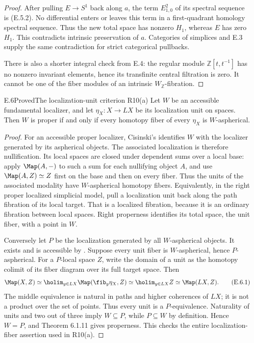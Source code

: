 \begin{proof}
After pulling $E\to S^1$ back along $a$, the term
$E^2_{1,0}$ of its spectral sequence is (E.5.2).
No differential enters or leaves this term in a
first-quadrant homology spectral sequence. Thus the
new total space has nonzero $H_1$, whereas $E$ has zero
$H_1$. This contradicts intrinsic preservation of $a$.
Categories of simplices and E.3 supply the same contradiction
for strict categorical pullbacks.

There is also a shorter integral check from E.4:
the regular module $\mathbb Z[t,t^{-1}]$ has no nonzero
invariant elements, hence its transfinite central filtration
is zero. It cannot be one of the fiber modules of an
intrinsic $W_{\mathbb Z}$-fibration.
\end{proof}

\begin{claim}{E.6}{Proved}{The localization-unit criterion R10(a)}
Let $W$ be an accessible fundamental localizer, and let
$\eta_X:X\to LX$ be its localization unit on spaces.
Then $W$ is proper if and only if every homotopy fiber
of every $\eta_X$ is $W$-aspherical.
\end{claim}
\begin{proof}
For an accessible proper localizer, Cisinski's
\citet[Theorem 6.1.11]{EH5Cisinski2006} identifies $W$
with the localizer generated by its aspherical objects.
The associated localization is therefore nullification.
Its local spaces are closed under dependent sums over
a local base: apply $\Map(A,-)$ to such a sum for each
nullifying object $A$, and use
$\Map(A,Z)\simeq Z$ first on the base and then on
every fiber. Thus the units of the associated modality
have $W$-aspherical homotopy fibers. Equivalently, in
the right proper localized simplicial model, pull a
localization unit back along the path fibration of
its local target. That is a localized fibration,
because it is an ordinary fibration between local
spaces. Right properness identifies its total space,
the unit fiber, with a point in $W$.

Conversely let $P$ be the localization generated by all
$W$-aspherical objects. It exists and is accessible
by \citet[Proposition 6.1.8]{EH5Cisinski2006}.
Suppose every unit fiber is $W$-aspherical, hence
$P$-aspherical. For a $P$-local space $Z$, write the
domain of a unit as the homotopy colimit of its
fiber diagram over its full target space. Then
\[
 \Map(X,Z)
   \simeq\holim_{y\in LX}\Map(\fib_y\eta_X,Z)
   \simeq\holim_{y\in LX}Z
   \simeq\Map(LX,Z).                                    \tag{E.6.1}
\]
The middle equivalence is natural in paths and
higher coherences of $LX$; it is not a product
over the set of points. Thus every unit is a
$P$-equivalence. Naturality of units and two out
of three imply $W\subseteq P$, while $P\subseteq W$
by definition. Hence $W=P$, and Theorem 6.1.11
gives properness. This checks the entire
localization-fiber assertion used in R10(a).
\end{proof}

